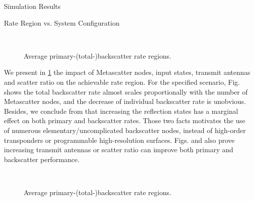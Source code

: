 \documentclass[journal]{IEEEtran}
\begin{document}
\begin{section}{Simulation Results}
	\begin{subsection}{Rate Region vs. System Configuration}
		\begin{figure}[!t]
			\centering
			\\
			\caption{Average primary-(total-)backscatter rate regions.}
			\label{fi:region_config_1}
		\end{figure}

		We present in \ref{fi:region_config_1} the impact of Metascatter nodes, input states, transmit antennas and scatter ratio on the achievable rate region.
		For the specified scenario, Fig.  shows the total backscatter rate almost scales proportionally with the number of Metascatter nodes, and the decrease of individual backscatter rate is unobvious.
		Besides, we conclude from  that increasing the reflection states has a marginal effect on both primary and backscatter rates.
		Those two facts motivates the use of numerous elementary/uncomplicated backscatter nodes, instead of high-order transponders or programmable high-resolution surfaces.
		Figs.  and  also prove increasing transmit antennas or scatter ratio can improve both primary and backscatter performance.

		\begin{figure}[!t]
			\centering
			\\
			\caption{Average primary-(total-)backscatter rate regions.}
			\label{fi:region_config_2}
		\end{figure}


\end{subsection}
\end{section}
\end{document}
